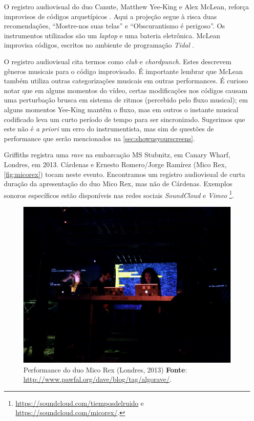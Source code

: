 O registro audiovisual do duo Canute, Matthew Yee-King e Alex McLean, reforça improvisos de códigos arquetípicos . Aqui a projeção segue à risca duas recomendações, ``Mostre-nos suas telas''\label{sec:showusyourscreens} e ``Obscurantismo é perigoso''. Os instrumentos utilizados são um \emph{laptop} e uma bateria eletrônica.  McLean improvisa códigos, escritos no ambiente de programação \emph{Tidal} . 


O registro audiovisual cita termos como \emph{club} e \emph{chordpunch}. Estes descrevem gêneros musicais para o código improvisado. É importante lembrar que McLean também utiliza outras categorizações musicais em outras performances. É curioso notar que em alguns momentos do vídeo, certas modificações nos códigos causam uma perturbação brusca em sistema de ritmos (percebido pelo fluxo musical); em alguns momentos Yee-King mantêm o fluxo, mas em outros o instante musical codificado leva um curto período de tempo para ser sincronizado. Sugerimos que este não é  \emph{a priori} um erro do instrumentista, mas sim de questões de performance que serão mencionados na \autoref{sec:showusyourscreens}.

Griffiths registra uma \emph{rave} na embarcação  MS Stubnitz, em Canary Wharf, Londres, em 2013. Cárdenas e Ernesto Romero/Jorge Ramírez (Mico Rex, \autoref{fig:micorex}) tocam neste evento. Encontramos um registro audiovisual de curta duração da apresentação do duo Mico Rex, mas não de Cárdenas. Exemplos sonoros específicos estão disponíveis nas redes sociais \emph{SoundCloud} e \emph{Vimeo} \footnote{\url{https://soundcloud.com/tiemposdelruido} e \url{https://soundcloud.com/micorex/}.}.

\begin{figure}[!h]
  \centering
  \includegraphics[scale=0.31]{imagens/cardenas.jpg}
  \caption{Performance do duo Mico Rex (Londres, 2013) \textbf{Fonte}: \url{http://www.pawfal.org/dave/blog/tag/algorave/}.}
  \label{fig:cardenas}
\end{figure}

